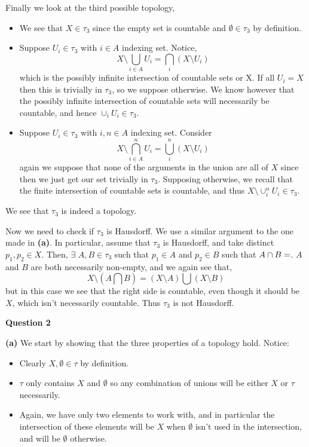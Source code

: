 \documentclass[10pt]{article}
\begin{document}
Finally we look at the third possible topology,
\begin{itemize}
\item We see that $X\in \tau_{3}$ since the empty set is countable and $\emptyset \in \tau_{3}$ by definition.
\item Suppose $U_{i}\in \tau_{3}$ with $i\in A$ indexing set. Notice,
  $$X \setminus \bigcup_{i\in A} U_{i} = \bigcap_{i}\left(X\setminus U_{i}\right)$$
  which is the possibly infinite intersection of countable sets or X. If all $U_{i} = X$ then this is trivially in $\tau_{3}$, so we suppose otherwise. We know however that the possibly infinite intersection of countable sets will necessarily be countable, and hence $\cup_{i}U_{i} \in \tau_{3}$.
\item Suppose $U_{i}\in \tau_{3}$ with $i,n \in A$ indexing set. Consider
  $$X \setminus \bigcap_{i\in A}^{n} U_{i} = \bigcup_{i}^{n}\left(X\setminus U_{i}\right)$$
  again we suppose that none of the arguments in the union are all of $X$ since then we just get our set trivially in $\tau_{3}$. Supposing otherwise, we recall that the finite intersection of countable sets is countable, and thus $X\setminus \cup_{i}^{n}U_{i} \in \tau_{3}$.
\end{itemize}
We see that $\tau_{3}$ is indeed a topology.

Now we need to check if $\tau_{3}$ is Hausdorff. We use a similar argument to the one made in \textbf{(a)}. In particular, assume that $\tau_{3}$ is Hausdorff, and take distinct $p_{1},p_{2}\in X$. Then, $\exists$ $A,B\in \tau_{3}$ such that $p_{1}\in A$ and $p_{2}\in B$ such that $A\cap B = \empty$. $A$ and $B$ are both necessarily non-empty, and we again see that,
$$X\setminus \left(A \bigcap B\right) = \left(X\setminus A\right) \bigcup \left(X\setminus B\right)$$
but in this case we see that the right side is countable, even though it should be $X$, which isn't necessarily countable. Thus $\tau_{3}$ is not Hausdorff.

\newpage

\textbf{Question 2}

\textbf{(a)} We start by showing that the three properties of a topology hold. Notice:
\begin{itemize}
\item Clearly $X,\emptyset \in \tau$ by definition.
\item $\tau$ only contains $X$ and $\emptyset$ so any combination of unions will be either $X$ or $\tau$ necessarily.
\item Again, we have only two elements to work with, and in particular the intersection of these elements will be $X$ when $\emptyset$ isn't used in the intersection, and will be $\emptyset$ otherwise.
\end{itemize}
\end{document}
